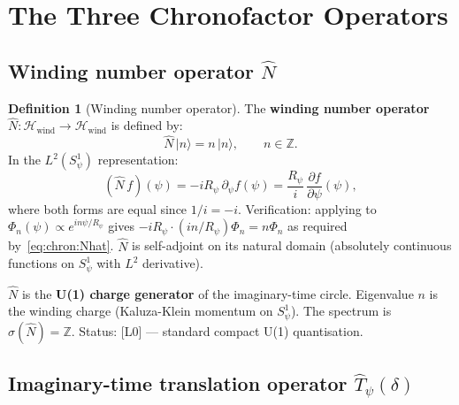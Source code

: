 \documentclass[12pt,a4paper]{article}
\theoremstyle{definition}
\newtheorem{definition}[theorem]{Definition}
\theoremstyle{remark}
\begin{document}
\section{The Three Chronofactor Operators}
\label{sec:chron:operators}

\subsection{Winding number operator $\hat{N}$}

\begin{definition}[Winding number operator]
\label{def:chron:Nhat}
The \textbf{winding number operator} $\hat{N}: \mathcal{H}_{\mathrm{wind}} \to \mathcal{H}_{\mathrm{wind}}$
is defined by:
\begin{equation}
  \hat{N}\,|n\rangle = n\,|n\rangle,
  \qquad n \in \mathbb{Z}.
  \label{eq:chron:Nhat}
\end{equation}
In the $L^2(S^1_\psi)$ representation:
\begin{equation}
  (\hat{N}\,f)(\psi)
  = -i R_\psi\,\partial_\psi f(\psi)
  = \frac{R_\psi}{i}\,\frac{\partial f}{\partial \psi}(\psi),
  \label{eq:chron:Nhat_diff}
\end{equation}
where both forms are equal since $1/i = -i$.  Verification: applying to
$\Phi_n(\psi) \propto e^{in\psi/R_\psi}$ gives
$-iR_\psi \cdot (in/R_\psi) \Phi_n = n\Phi_n$ as required by~\eqref{eq:chron:Nhat}.
$\hat{N}$ is self-adjoint on its natural domain (absolutely continuous functions
on $S^1_\psi$ with $L^2$ derivative).
\end{definition}

\begin{resultbox}
$\hat{N}$ is the \textbf{U(1) charge generator} of the imaginary-time circle.
Eigenvalue $n$ is the winding charge (Kaluza-Klein momentum on $S^1_\psi$).
The spectrum is $\sigma(\hat{N}) = \mathbb{Z}$.
Status: [L0] — standard compact U(1) quantisation.
\end{resultbox}

\subsection{Imaginary-time translation operator $\hat{T}_\psi(\delta)$}
\end{document}
